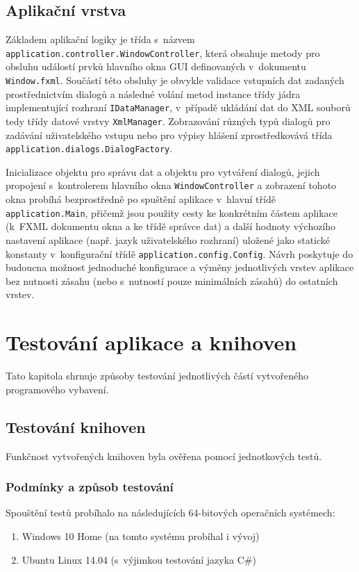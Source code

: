 \documentclass[czech,BP]{thesiskiv}
\begin{document}
\section{Aplikační vrstva}
Základem aplikační logiky je třída s~názvem \texttt{application.controller\-.WindowController}, která obsahuje metody pro obsluhu událostí prvků hlavního okna GUI definovaných v~dokumentu \texttt{Window.fxml}. Součástí této obsluhy je obvykle validace vstupních dat zadaných prostřednictvím dialogů a následné volání metod instance třídy jádra implementující rozhraní \texttt{IDataManager}, v~případě ukládání dat do XML souborů tedy třídy datové vrstvy \texttt{XmlManager}. Zobrazování různých typů dialogů pro zadávání uživatelského vstupu nebo pro výpisy hlášení zprostředkovává třída \texttt{application\-.dialogs.DialogFactory}.\par
Inicializace objektu pro správu dat a objektu pro vytváření dialogů, jejich propojení s~kontrolerem hlavního okna \texttt{WindowController} a zobrazení tohoto okna probíhá bezprostředně po spuštění aplikace v~hlavní třídě \texttt{application.Main}, přičemž jsou použity cesty ke konkrétním částem aplikace (k~FXML dokumentu okna a ke třídě správce dat) a další hodnoty výchozího nastavení aplikace (např. jazyk uživatelského rozhraní) uložené jako statické konstanty v~konfigurační třídě \texttt{application.config.Config}. Návrh poskytuje do budoucna možnost jednoduché konfigurace a výměny jednotlivých vrstev aplikace bez nutnosti zásahu (nebo s~nutností pouze minimálních zásahů) do ostatních vrstev.

\chapter{Testování aplikace a knihoven}
Tato kapitola shrnuje způsoby testování jednotlivých částí vytvořeného programového vybavení.
\section{Testování knihoven}
Funkčnost vytvořených knihoven byla ověřena pomocí jednotkových testů.

\subsection{Podmínky a způsob testování}
Spouštění testů probíhalo na následujících 64-bitových operačních systémech:
\begin{enumerate}
\item{Windows 10 Home (na tomto systému probíhal i vývoj)}
\item{Ubuntu Linux 14.04 (s~výjimkou testování jazyka C\#)}
\end{enumerate}
\end{document}
